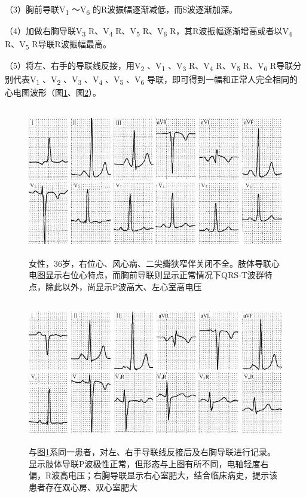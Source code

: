 （3）胸前导联V\textsubscript{1} ～V\textsubscript{6}
的R波振幅逐渐减低，而S波逐渐加深。

（4）加做右胸导联V\textsubscript{3} R、V\textsubscript{4}
R、V\textsubscript{5} R、V\textsubscript{6}
R，其R波振幅逐渐增高或者以V\textsubscript{4} R、V\textsubscript{5}
R导联R波振幅最高。

（5）将左、右手的导联线反接，用V\textsubscript{2} 、V\textsubscript{1}
、V\textsubscript{3} R、V\textsubscript{4} R、V\textsubscript{5}
R、V\textsubscript{6} R导联分别代表V\textsubscript{1}
、V\textsubscript{2} 、V\textsubscript{3} 、V\textsubscript{4}
、V\textsubscript{5} 、V\textsubscript{6}
导联，即可得到一幅和正常人完全相同的心电图波形（图\ref{fig41-8}、图\ref{fig41-9}）。

\begin{figure}[!htbp]
 \centering
 \includegraphics[width=5.1875in,height=2.58333in]{./images/Image00690.jpg}
 \captionsetup{justification=centering}
 \caption{女性，36岁，右位心、风心病、二尖瓣狭窄伴关闭不全。肢体导联心电图显示右位心特点，而胸前导联则显示正常情况下QRS-T波群特点，除此以外，尚显示P波高大、左心室高电压}
 \label{fig41-8}
  \end{figure} 

\begin{figure}[!htbp]
 \centering
 \includegraphics[width=5.1875in,height=2.47917in]{./images/Image00691.jpg}
 \captionsetup{justification=centering}
 \caption{与图\ref{fig41-8}系同一患者，对左、右手导联线反接后及右胸导联进行记录。显示肢体导联P波极性正常，但形态与上图有所不同，电轴轻度右偏，R波高电压；右胸导联显示右心室肥大，结合临床病史，提示该患者存在双心房、双心室肥大}
 \label{fig41-9}
  \end{figure} 

